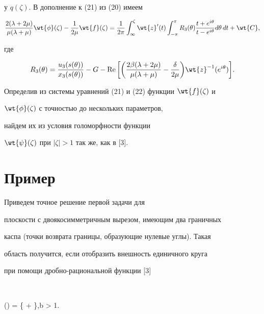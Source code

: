 у $q(\zeta)$. В дополнение к (21) из (20) имеем


\begin{equation}


\frac{2(\lambda + 2 \mu)}{\mu(\lambda + \mu)} \wt{\phi}(\zeta)


- \frac{1}{2\mu} \wt{f}(\zeta) =


\frac{1}{2\pi}\int_{\infty}^{\zeta} \wt{z}'(t)


\int_{-\pi}^{\pi} R_3(\theta) \frac{t + e^{i\theta}}{t -


e^{i\theta}} d\theta\, dt + \wt{C},


\end{equation}


где


$$


R_3(\theta) = \frac{u_3(s(\theta))}{x_3(s(\theta))} - G -


\re\bigg[\bigg(\frac{2\beta(\lambda + 2 \mu)}{\mu(\lambda + \mu)} -


\frac{\delta}{2\mu}\bigg) \wt{z}^{-1}(e^{i\theta})\bigg].


$$


Определив из системы уравнений (21) и (22) функции $\wt{f}(\zeta)$ и


$\wt{\phi}(\zeta)$ с точностью до нескольких параметров,


найдем их из условия голоморфности функции


$\wt{\psi}(\zeta)$ при $|\zeta|> 1$ так же, как в [3].








\section{Пример}





Приведем точное решение первой задачи для


плоскости с двоякосимметричным вырезом, имеющим два граничных


каспа (точки возврата границы, образующие нулевые углы). Такая


область получится, если отобразить внешность единичного круга


при помощи дробно-рациональной функции [3]


$$


(\zeta) =  \bigg\{ + \bigg\},\quad b > 1.


